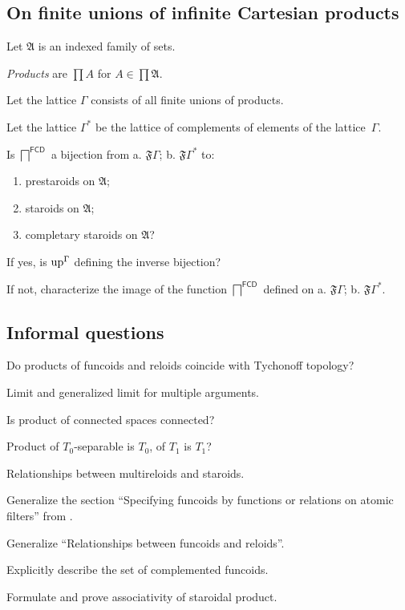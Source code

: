 \subsection{On finite unions of infinite Cartesian products}

Let $\mathfrak{A}$ is an indexed family of sets.

\emph{Products} are $\prod A$ for $A\in\prod\mathfrak{A}$.

Let the lattice $\Gamma$ consists of all finite unions of products.

Let the lattice $\Gamma^{\ast}$ be the lattice of complements of
elements of the lattice~$\Gamma$.
\begin{problem}
Is $\bigsqcap^{\mathsf{FCD}}$ a bijection from a. $\mathfrak{F}\Gamma$;
b. $\mathfrak{F}\Gamma^{\ast}$ to:
\begin{enumerate}
\item prestaroids on $\mathfrak{A}$;
\item staroids on $\mathfrak{A}$;
\item completary staroids on $\mathfrak{A}$?
\end{enumerate}
If yes, is $\operatorname{up}^{\Gamma}$ defining the inverse bijection?

If not, characterize the image of the function $\bigsqcap^{\mathsf{FCD}}$
defined on a. $\mathfrak{F}\Gamma$; b. $\mathfrak{F}\Gamma^{\ast}$.
\end{problem}

\subsection{Informal questions}

Do products of funcoids and reloids coincide with Tychonoff topology?

Limit and generalized limit for multiple arguments.

Is product of connected spaces connected?

Product of $T_{0}$-separable is $T_{0}$, of $T_{1}$ is $T_{1}$?

Relationships between multireloids and staroids.

Generalize the section ``Specifying funcoids by functions or relations
on atomic filters'' from \cite{pointfree}.

Generalize ``Relationships between funcoids and reloids''.

Explicitly describe the set of complemented funcoids.

Formulate and prove associativity of staroidal product.
